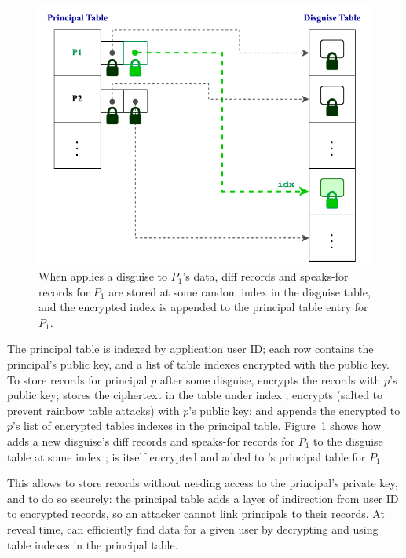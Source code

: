 \begin{figure}
    \centering
    \includegraphics[width=.8\textwidth]{figs/indexes}
    \caption[\sys stores disguised data using a layer of indirection with
    encrypted indexes.]{When \sys applies a disguise to $P_1$'s data, diff
    records and speaks-for records for $P_1$ are stored at some random index
     in the disguise table, and the encrypted index is appended to the
    principal table entry for $P_1$.}
\label{f:indexes}
\end{figure}

The principal table is indexed by application user ID; each row contains the
principal's public key, and a list of \xx table indexes encrypted with the
public key.
%
To store records for principal $p$ after some disguise, \sys \one{} encrypts the records with
$p$'s public key; \two{} stores the ciphertext in the \xx table under index
; \three{} encrypts  (salted to
prevent rainbow table attacks) with $p$'s public key; and \four{} appends the
encrypted  to $p$'s list of encrypted \xx tables indexes
in the principal table.
%
Figure~\ref{f:indexes} shows how \sys adds a new disguise's diff records and
speaks-for records for $P_1$ to the disguise table at some index ;  is itself
encrypted and added to \sys's principal table for $P_1$.


%
This allows \sys to store records without needing access to the principal's
private key, and to do so securely: the principal table adds a layer of
indirection from user ID to encrypted records, so an attacker cannot link
principals to their records.
%
At reveal time, \sys can efficiently find \xxed data for a given user
by decrypting and using \xx table indexes in the principal table.
%
%


